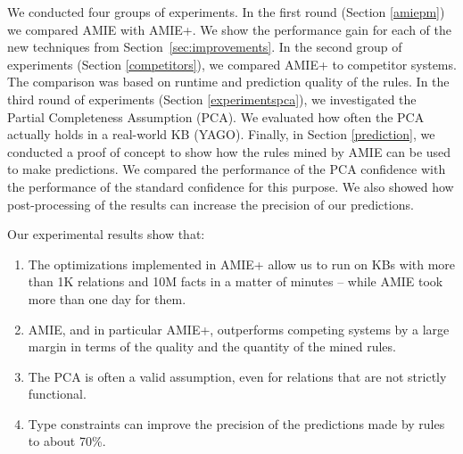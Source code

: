 
We conducted four groups of experiments. 
In the first round (Section \ref{amiepm}) we compared AMIE with AMIE+. We show the performance gain 
for each of the new techniques from Section~\ref{sec:improvements}. 
In the second group of experiments (Section \ref{competitors}), we compared AMIE+ to competitor systems. 
The comparison was based on runtime and prediction quality of the rules.
In the third round of experiments (Section \ref{experimentspca}), we investigated the Partial Completeness Assumption (PCA). 
We evaluated how often the PCA actually holds in a real-world KB (YAGO). 
Finally, in Section \ref{prediction}, we conducted a proof of concept to show how the rules mined by AMIE 
can be used to make predictions. 
We compared the performance of the PCA confidence with the performance of the standard confidence for this purpose. 
We also showed how post-processing of the results can increase the precision of our predictions. 

Our experimental results show that:
\begin{enumerate}
 \item The optimizations implemented in AMIE+ allow us to run on KBs with more than 1K relations and 10M facts in a matter of minutes -- while AMIE took more than one day for them.
 \item AMIE, and in particular AMIE+, outperforms competing systems by a large margin in terms of the quality and the quantity of the mined rules.
 \item The PCA is often a valid assumption, even for relations that are not strictly functional. 
 \item Type constraints can improve the precision of the predictions made by rules to about 70\%.
\end{enumerate}

